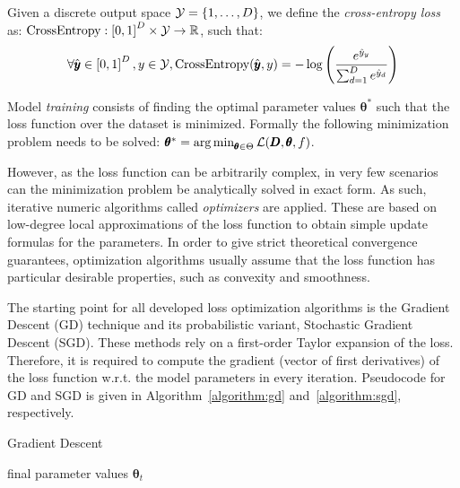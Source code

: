 \begin{definition}
Given a discrete output space $\mathcal{Y}=\mathopen{}\left\{1,\dots,D\right\}$, we define the \emph{cross-entropy loss} as: $\text{CrossEntropy}: \mathopen{}\left[0, 1\right]^D \times \mathcal{Y} \to \mathbb{R}$, such that:
\begin{equation}
\forall \hat{\pmb{y}} \in \mathopen{}\left[0, 1\right]^D, y \in \mathcal{Y}, \text{CrossEntropy}\mathopen{}\left(\hat{\pmb{y}},y\right)= - \log{\mathopen{}\left(\frac{e^{\hat{y}_y}}{\sum_{d=1}^{D}{e^{\hat{y}_d}}}\right)}\end{equation}
\end{definition}

\begin{definition}
Model \emph{training} consists of finding the optimal parameter values $\pmb{\theta}^*$ such that the loss function over the dataset is minimized. Formally the following minimization problem needs to be solved: $\pmb{\theta}^* = \operatorname*{arg\,min}_{\pmb{\theta} \in \Theta}{\mathcal{L}\mathopen{}\left(\pmb{D}, \pmb{\theta}, f\right)}$.
\end{definition}

However, as the loss function can be arbitrarily complex, in very few scenarios can the minimization problem be analytically solved in exact form. As such, iterative numeric algorithms called \emph{optimizers} are applied. These are based on low-degree local approximations of the loss function to obtain simple update formulas for the parameters. In order to give strict theoretical convergence guarantees, optimization algorithms usually assume that the loss function has particular desirable properties, such as convexity and smoothness.

The starting point for all developed loss optimization algorithms is the Gradient Descent (GD) technique and its probabilistic variant, Stochastic Gradient Descent (SGD). These methods rely on a first-order Taylor expansion of the loss. Therefore, it is required to compute the gradient (vector of first derivatives) of the loss function w.r.t. the model parameters in every iteration. Pseudocode for GD and SGD is given in Algorithm~\ref{algorithm:gd} and~\ref{algorithm:sgd}, respectively.

\begin{algorithm}%
\caption{Gradient Descent}
\label{algorithm:gd}
\begin{algorithmic}
\ENDWHILE
\RETURN final parameter values $\pmb{\theta}_{t}$
\end{algorithmic}
\end{algorithm} 

